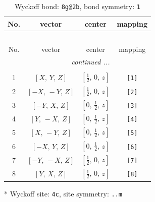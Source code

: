 \documentclass[fleqn,8pt]{jsarticle}
\begin{document}
\begin{longtable}{cccc}
\caption{Wyckoff bond: {\tt 8g@2b}, bond symmetry: {\tt 1}}
 \\
 \hline \hline
No. & vector & center & mapping \\ \hline \endfirsthead

\multicolumn{3}{l}{\tablename\ \thetable{}} \\
 \hline \hline
No. & vector & center & mapping \\ \hline \endhead

 \hline \hline
\multicolumn{3}{r}{\footnotesize\it continued ...} \\ \endfoot

 \hline \hline
\multicolumn{3}{r}{} \\ \endlastfoot

1 & $\left[ X,\, Y,\, Z \right]$ & $\left[ \frac{1}{2},\, 0,\, z \right]$ & {\tt [1]} \\ \hline
2 & $\left[ - X,\, - Y,\, Z \right]$ & $\left[ \frac{1}{2},\, 0,\, z \right]$ & {\tt [2]} \\ \hline
3 & $\left[ - Y,\, X,\, Z \right]$ & $\left[ 0,\, \frac{1}{2},\, z \right]$ & {\tt [3]} \\ \hline
4 & $\left[ Y,\, - X,\, Z \right]$ & $\left[ 0,\, \frac{1}{2},\, z \right]$ & {\tt [4]} \\ \hline
5 & $\left[ X,\, - Y,\, Z \right]$ & $\left[ 0,\, \frac{1}{2},\, z \right]$ & {\tt [5]} \\ \hline
6 & $\left[ - X,\, Y,\, Z \right]$ & $\left[ 0,\, \frac{1}{2},\, z \right]$ & {\tt [6]} \\ \hline
7 & $\left[ - Y,\, - X,\, Z \right]$ & $\left[ \frac{1}{2},\, 0,\, z \right]$ & {\tt [7]} \\ \hline
8 & $\left[ Y,\, X,\, Z \right]$ & $\left[ \frac{1}{2},\, 0,\, z \right]$ & {\tt [8]} \\
\end{longtable}
* Wyckoff site: {\tt 4c}, site symmetry: {\tt ..m}
\renewcommand{\arraystretch}{1.2}
\end{document}
